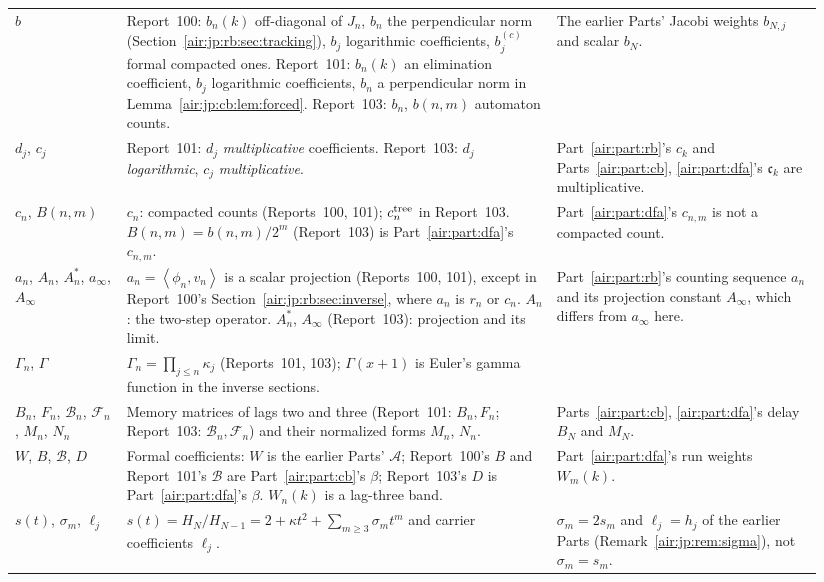 \documentclass[11pt,letterpaper]{article}
\numberwithin{equation}{section}
\theoremstyle{remark}
\newcommand{\ip}[2]{\left\langle#1,#2\right\rangle}
\begin{document}
{\begin{longtable}{@{}>{\raggedright\arraybackslash}p{0.13\linewidth}>{\raggedright\arraybackslash}p{0.5\linewidth}>{\raggedright\arraybackslash}p{0.31\linewidth}@{}}
$b$ & Report~100: $b_n(k)$ off-diagonal of $J_n$, $b_n$ the perpendicular norm (Section~\ref{air:jp:rb:sec:tracking}), $b_j$ logarithmic coefficients, $b_j^{(c)}$ formal compacted ones. Report~101: $b_n(k)$ an elimination coefficient, $b_j$ logarithmic coefficients, $b_n$ a perpendicular norm in Lemma~\ref{air:jp:cb:lem:forced}. Report~103: $b_n$, $b(n,m)$ automaton counts. & The earlier Parts' Jacobi weights $b_{N,j}$ and scalar $b_N$.\\
$d_j$, $c_j$ & Report~101: $d_j$ \emph{multiplicative} coefficients. Report~103: $d_j$ \emph{logarithmic}, $c_j$ \emph{multiplicative}. & Part~\ref{air:part:rb}'s $c_k$ and Parts~\ref{air:part:cb}, \ref{air:part:dfa}'s $\mathfrak c_k$ are multiplicative.\\
$c_n$, $B(n,m)$ & $c_n$: compacted counts (Reports~100, 101); $c_n^{\rm tree}$ in Report~103. $B(n,m)=b(n,m)/2^m$ (Report~103) is Part~\ref{air:part:dfa}'s $c_{n,m}$. & Part~\ref{air:part:dfa}'s $c_{n,m}$ is not a compacted count.\\
$a_n$, $A_n$, $A_n^*$, $a_\infty$, $A_\infty$ & $a_n=\ip{\phi_n}{v_n}$ is a scalar projection (Reports~100, 101), except in Report~100's Section~\ref{air:jp:rb:sec:inverse}, where $a_n$ is $r_n$ or $c_n$. $A_n$: the two-step operator. $A_n^*$, $A_\infty$ (Report~103): projection and its limit. & Part~\ref{air:part:rb}'s counting sequence $a_n$ and its projection constant $A_\infty$, which differs from $a_\infty$ here.\\
$\Gamma_n$, $\Gamma$ & $\Gamma_n=\prod_{j\le n}\kappa_j$ (Reports~101, 103); $\Gamma(x+1)$ is Euler's gamma function in the inverse sections. & \\
$B_n$, $F_n$, $\mathcal B_n$, $\mathcal F_n$, $M_n$, $N_n$ & Memory matrices of lags two and three (Report~101: $B_n,F_n$; Report~103: $\mathcal B_n,\mathcal F_n$) and their normalized forms $M_n$, $N_n$. & Parts~\ref{air:part:cb}, \ref{air:part:dfa}'s delay $B_N$ and $M_N$.\\
$W$, $B$, $\mathcal B$, $D$ & Formal coefficients: $W$ is the earlier Parts' $\mathcal A$; Report~100's $B$ and Report~101's $\mathcal B$ are Part~\ref{air:part:cb}'s $\beta$; Report~103's $D$ is Part~\ref{air:part:dfa}'s $\beta$. $W_n(k)$ is a lag-three band. & Part~\ref{air:part:dfa}'s run weights $W_m(k)$.\\
$s(t)$, $\sigma_m$, $\ell_j$ & $s(t)=H_N/H_{N-1}=2+\kappa t^2+\sum_{m\ge3}\sigma_mt^m$ and carrier coefficients $\ell_j$. & $\sigma_m=2s_m$ and $\ell_j=h_j$ of the earlier Parts (Remark~\ref{air:jp:rem:sigma}), not $\sigma_m=s_m$.\\

\end{longtable}}
\end{document}
